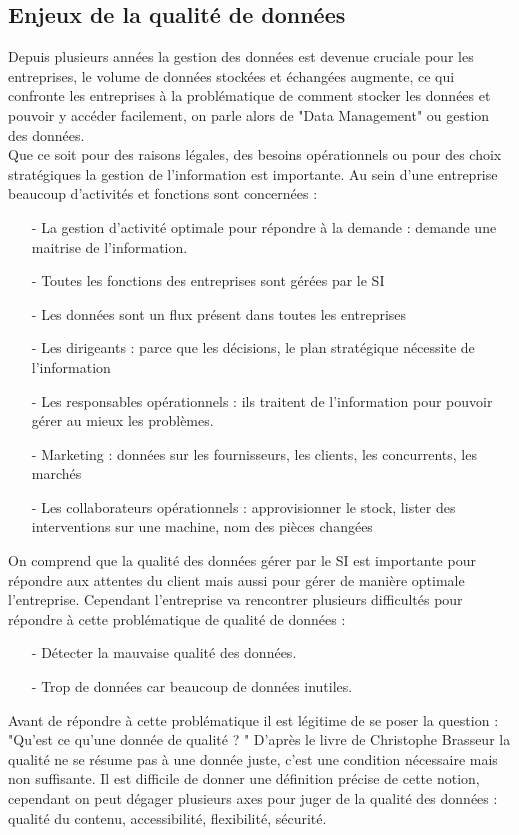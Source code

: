 \subsection {Enjeux de la qualité de données}
Depuis plusieurs années la gestion des données est devenue cruciale pour les entreprises, le volume de données stockées et échangées augmente, ce qui confronte les entreprises à la problématique de comment stocker les données et pouvoir y accéder facilement, on parle alors de  "Data Management" ou gestion des données.\\ Que ce soit pour des raisons légales, des besoins opérationnels ou pour des choix stratégiques la gestion de l'information est importante.  Au sein d'une entreprise beaucoup d'activités et fonctions sont concernées :
\begin{itemize}
\item[-] La gestion d’activité optimale pour répondre à la demande : demande une maitrise de l’information.
\item[-] Toutes les fonctions des entreprises sont gérées par le SI
\item[-] Les données sont un flux présent dans toutes les entreprises
\item[-] Les dirigeants : parce que les décisions, le plan stratégique nécessite de l’information
\item[-] Les responsables opérationnels : ils traitent de l’information pour pouvoir gérer au mieux les problèmes. 
\item[-] Marketing : données sur les fournisseurs, les clients, les concurrents, les marchés
\item[-] Les collaborateurs opérationnels : approvisionner le stock, lister des interventions sur une machine, nom des pièces changées
\end{itemize}
On comprend que la qualité des données gérer par le SI est importante pour répondre aux attentes du client mais aussi pour gérer de manière optimale l'entreprise. Cependant l'entreprise va rencontrer plusieurs difficultés pour répondre à cette problématique de  qualité de données : 
\begin{itemize}
\item[-]Détecter la mauvaise qualité des données.
\item[-]Trop de données car beaucoup de données inutiles. 
\end{itemize}
Avant de répondre à cette problématique il est légitime de se poser la question : "Qu'est ce qu'une donnée de qualité ? "
D'après le livre de Christophe Brasseur \cite{Brasseur} la qualité ne se résume pas à une donnée juste, c'est une condition nécessaire mais non suffisante. Il est difficile de donner une définition précise de cette notion, cependant on peut dégager plusieurs axes pour juger de la qualité des données : qualité du contenu, accessibilité, flexibilité, sécurité.

